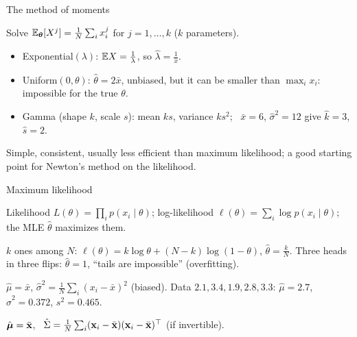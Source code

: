 \documentclass[aspectratio=1610,11pt]{beamer}
\begin{document}
\begin{frame}{The method of moments}
    \begin{definition}
        \small Solve $\mathbb{E}_{\boldsymbol\theta}[X^j] = \frac{1}{N}\sum_ix_i^j$ for $j = 1, \ldots, k$ ($k$ parameters).
    \end{definition}
    \begin{example}[][ex:moments]
        \small
        \begin{itemize}
            \item Exponential$(\lambda)$: $\mathbb{E} X = \frac{1}{\lambda}$, so $\hat\lambda = \frac{1}{\bar x}$.
            \item Uniform$(0, \theta)$: $\hat\theta = 2\bar x$, unbiased, but it can be smaller than $\max_ix_i$: impossible for the true $\theta$.
            \item Gamma (shape $k$, scale $s$): mean $ks$, variance $ks^2$; \ $\bar x = 6$, $\hat\sigma^2 = 12$ give $\hat k = 3$, $\hat s = 2$.
        \end{itemize}
    \end{example}
    \small Simple, consistent, usually less efficient than maximum likelihood; a good starting point for Newton's method on the likelihood.
\end{frame}

\begin{frame}{Maximum likelihood}
    \begin{definition}
        \small Likelihood $L(\theta) = \prod_ip(x_i \mid \theta)$; log-likelihood $\ell(\theta) = \sum_i\log p(x_i \mid \theta)$; the MLE $\hat\theta$ maximizes them.
    \end{definition}
    \begin{example}
        \small $k$ ones among $N$: $\ell(\theta) = k\log\theta + (N - k)\log(1 - \theta)$, $\hat\theta = \frac{k}{N}$. Three heads in three flips: $\hat\theta = 1$, ``tails are impossible'' (overfitting).
    \end{example}
    \begin{example}
        \small $\hat\mu = \bar x$, $\hat\sigma^2 = \frac{1}{N}\sum_i(x_i - \bar x)^2$ (biased). Data $2.1, 3.4, 1.9, 2.8, 3.3$: $\hat\mu = 2.7$, $\hat\sigma^2 = 0.372$, $s^2 = 0.465$.
    \end{example}
    \begin{theorem}
        \small $\hat{\boldsymbol\mu} = \bar{\mathbf{x}}$, \ $\hat\Sigma = \frac{1}{N}\sum_i(\mathbf{x}_i - \bar{\mathbf{x}})(\mathbf{x}_i - \bar{\mathbf{x}})^\top$ (if invertible).
    \end{theorem}
\end{frame}
\end{document}
